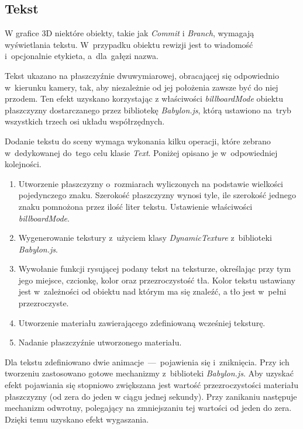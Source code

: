 \documentclass[12pt,a4paper,polish,thesis]{dcsbook}
\begin{document}
{\begin{description}
	\end{description}

	\subsection{Tekst}
	W grafice 3D niektóre obiekty, takie jak \textit{Commit} i \textit{Branch}, wymagają wyświetlania tekstu. W~przypadku obiektu rewizji jest to wiadomość i~opcjonalnie etykieta, a~dla~gałęzi nazwa.

	Tekst ukazano na płaszczyźnie dwuwymiarowej, obracającej się odpowiednio w~kierunku kamery, tak, aby niezależnie od jej położenia zawsze być do niej przodem. Ten efekt uzyskano korzystając z właściwości \textit{billboardMode} obiektu płaszczyzny dostarczanego przez bibliotekę \textit{Babylon.js}, którą ustawiono na~tryb wszystkich trzech osi układu współrzędnych.

	Dodanie tekstu do sceny wymaga wykonania kilku operacji, które zebrano w~dedykowanej do~tego celu klasie \textit{Text}. Poniżej opisano je w~odpowiedniej kolejności.

	\begin{enumerate}
		\item Utworzenie płaszczyzny o~rozmiarach wyliczonych na podstawie wielkości pojedynczego znaku. Szerokość płaszczyzny wynosi tyle, ile szerokość jednego znaku pomnożona przez ilość liter tekstu. Ustawienie właściwości \textit{billboardMode}.

		\item Wygenerowanie tekstury z~użyciem klasy \textit{DynamicTexture} z~biblioteki \textit{Babylon.js}.

		\item Wywołanie funkcji rysującej podany tekst na teksturze, określając przy tym jego miejsce, czcionkę, kolor oraz przezroczystość tła. Kolor tekstu ustawiany jest w~zależności od obiektu nad którym ma się znaleźć, a tło jest w~pełni przezroczyste.

		\item Utworzenie materiału zawierającego zdefiniowaną wcześniej teksturę.

		\item Nadanie płaszczyźnie utworzonego materiału.
	\end{enumerate}

	Dla tekstu zdefiniowano dwie animacje~---~pojawienia się i~zniknięcia. Przy ich tworzeniu zastosowano gotowe mechanizmy z~biblioteki \textit{Babylon.js}. Aby uzyskać efekt pojawiania się stopniowo zwiększana jest wartość przezroczystości materiału płaszczyzny (od zera do jeden w ciągu jednej sekundy). Przy zanikaniu następuje mechanizm odwrotny, polegający na zmniejszaniu tej wartości od jeden do zera. Dzięki temu uzyskano efekt wygaszania.

}
\end{document}
